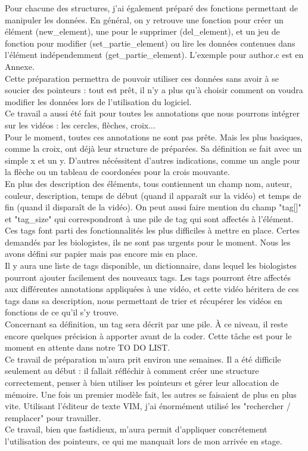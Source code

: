 \documentclass[11pt,french,a4paper]{report}
\begin{document}
Pour chacune des structures, j'ai également préparé des fonctions permettant de manipuler les données.
En général, on y retrouve une fonction pour créer un élément (new\_element), une pour le supprimer (del\_element),
et un jeu de fonction pour modifier (set\_partie\_element) ou lire les données contenues dans l'élément indépendemment 
(get\_partie\_element). L'exemple pour author.c est en Annexe.\\

Cette préparation permettra de pouvoir utiliser ces données sans avoir à se soucier des pointeurs : tout est prêt, il n'y
a plus qu'à choisir comment on voudra modifier les données lors de l'utilisation du logiciel. \\

Ce travail a aussi été fait pour toutes les annotations que nous pourrons intégrer sur les vidéos : 
les cercles, flèches, croix... \\

Pour le moment, toutes ces annotations ne sont pas prête. Mais les plus basiques, comme la croix, ont déjà leur structure de préparées.
Sa définition se fait avec un simple x et un y. D'autres nécéssitent d'autres indications, comme un angle pour la flèche
ou un tableau de coordonées pour la crois mouvante. \\
En plus des description des éléments, tous contiennent un champ nom, auteur, couleur, description, temps de début 
(quand il apparaît sur la vidéo) et temps de fin (quand il disparaît de la vidéo). 
On peut aussi faire mention du champ "tag[]" et "tag\_size" qui correspondront à une pile de tag qui sont affectés à l'élément. \\
Ces tags font parti des fonctionnalités les plus difficiles à mettre en place. Certes demandés par les biologistes, ils ne sont 
pas urgents pour le moment. Nous les avons défini sur papier mais pas encore mis en place. \\
Il y aura une liste de tags disponible, un dictionnaire, dans lequel les biologistes pourront 
ajouter facilement des nouveaux tags. Les tags pourront être affectés aux différentes annotations appliquées
à une vidéo, et cette vidéo héritera de ces tags dans sa description, nous permettant de trier et récupérer les vidéos 
en fonctions de ce qu'il s'y trouve. \\
Concernant sa définition, un tag sera décrit par une pile. À ce niveau, il reste encore quelques précision à apporter
avant de la coder. Cette tâche est pour le moment en attente dans notre TO DO LIST.\\
Ce travail de préparation m'aura prit environ une semaines. Il a été difficile seulement au début : il fallait réfléchir 
à comment créer une structure correctement, penser à bien utiliser les pointeurs et gérer leur allocation de
mémoire. Une fois un premier modèle fait, les autres se faisaient de plus en plus vite. Utilisant l'éditeur de texte VIM, j'ai 
énormément utilisé les "rechercher / remplacer" pour travailler. \\
Ce travail, bien que fastidieux, m'aura permit d'appliquer concrétement l'utilisation des pointeurs, ce qui 
me manquait lors de mon arrivée en stage. \\ 
\end{document}
